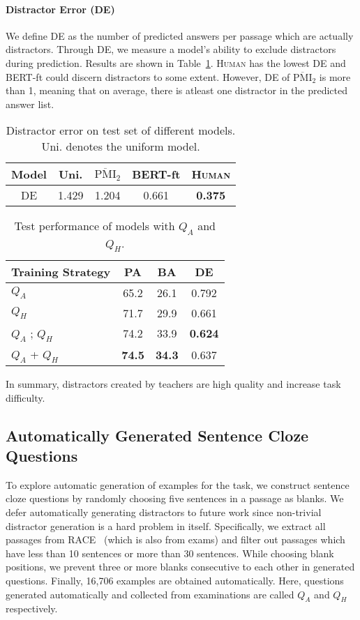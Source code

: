 \documentclass[11pt,a4paper]{article}
\begin{document}
\paragraph{Distractor Error (DE)}  We define DE as the number of predicted answers per passage which are actually distractors. Through DE, we measure a model's ability to exclude distractors during prediction. Results are shown in Table~\ref{tab:de_res}. \textsc{Human} has the lowest DE and BERT-ft could discern distractors to some extent. However, DE of $\overline{\textrm{PMI}}_{2}$  is more than 1, meaning that on average, there is atleast one distractor in the predicted answer list.

\begin{table}
    \centering
    \begin{tabular}{c|cccc}
    \toprule
        Model & Uni. &  $\overline{\textrm{PMI}}_{2}$  & BERT-ft & \textsc{Human} \\
        \midrule
        DE & 1.429 & 1.204 & 0.661 & \textbf{0.375}  \\
        \bottomrule
    \end{tabular}
    \caption{Distractor error on test set of different models. Uni. denotes the uniform model.}
    \label{tab:de_res}
\end{table}

\begin{table}
    \centering
    \begin{tabular}{l|ccc}
    \toprule
        Training Strategy &  PA&BA&DE\\
        \midrule
        $Q_{A}$ &   65.2&26.1&0.792\\
        $Q_{H}$ &  71.7 & 29.9&0.661\\
        $Q_{A}$ ; $Q_{H}$ & 74.2&33.9&\bf0.624\\
        $Q_{A}$ + $Q_{H}$ & \bf74.5 & \bf34.3 & 0.637\\
        \bottomrule
    \end{tabular}
    \caption{Test performance of models with $Q_{A}$ and $Q_{H}$.}
    \label{tab:random_res}
\end{table}

In summary, distractors created by teachers are high quality and increase task difficulty. 
\subsection{Automatically Generated Sentence Cloze Questions}
\label{subsec:qa}
To explore automatic generation of examples for the task, we construct sentence cloze questions by randomly choosing five sentences in a passage as blanks. We defer automatically generating distractors to future work since non-trivial distractor generation is a hard problem in itself. Specifically, we extract all passages from RACE~\cite{lai2017race} (which is also from exams) and filter out passages which have less than 10 sentences or more than 30 sentences. While choosing blank positions, we prevent three or more blanks consecutive to each other in generated questions. Finally, 16,706 examples are obtained automatically. Here, questions generated automatically and collected from examinations are called $Q_{A}$ and $Q_{H}$ respectively.
\end{document}

